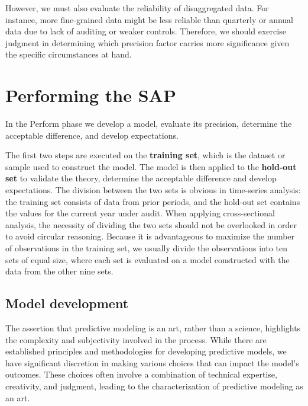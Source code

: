 However, we must also evaluate the reliability of disaggregated data. For instance, more fine-grained data might be less reliable than quarterly or annual data due to lack of auditing or weaker controls. 
Therefore, we should exercise judgment in determining which precision factor carries more significance given the specific circumstances at hand.



\section{Performing the SAP} %
\label{sec:application_of_the_sap}

In the Perform phase we develop a model, evaluate its precision, determine the acceptable difference, and develop expectations.

The first two steps are executed on the \textbf{training set}, which is the dataset or sample used to construct the model. 
The model is then applied to the \textbf{hold-out set} to validate the theory, determine the acceptable difference and develop expectations. 
The division between the two sets is obvious in time-series analysis: the training set consists of data from prior periods, and the hold-out set contains the values for the current year under audit. 
When applying cross-sectional analysis, the necessity of dividing the two sets should not be overlooked in order to avoid circular reasoning. 
Because it is advantageous to maximize the number of observations in the training set, we usually divide the observations into ten sets of equal size, where each set is evaluated on a model constructed with the data from the other nine sets.

\subsection{Model development} %
\label{sub:model_development}

The assertion that predictive modeling is an art, rather than a science, highlights the complexity and subjectivity involved in the process. While there are established principles and methodologies for developing predictive models, we have significant discretion in making various choices that can impact the model's outcomes. These choices often involve a combination of technical expertise, creativity, and judgment, leading to the characterization of predictive modeling as an art.

